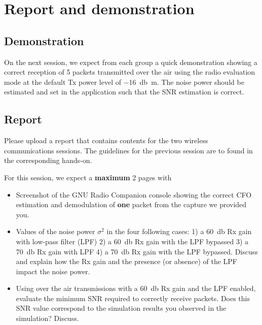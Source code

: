 \section{Report and demonstration}

\subsection{Demonstration}

On the next session, we expect from each group a quick demonstration showing a correct reception of 5 packets transmitted over the air using the radio evaluation mode
at the default Tx power level of \SI{-16}{\decibel\meter}. The noise power should be estimated and set in the application such that the SNR estimation is correct.

\subsection{Report}

Please upload a report that contains contents for the two wireless communications sessions.
The guidelines for the previous session are to found in the corresponding hands-on.

For this session, we expect a \textbf{maximum} 2 pages with
\begin{itemize}
    \item Screenshot of the GNU Radio Companion console showing the correct CFO estimation and demodulation of \textbf{one} packet from the capture we provided you.
    \item Values of the noise power $\sigma^2$ in the four following cases:
        1) a \SI{60}{\decibel} Rx gain with low-pass filter (LPF) 2) a \SI{60}{\decibel} Rx gain with the LPF bypassed 3) a \SI{70}{\decibel} Rx gain with LPF 4) a \SI{70}{\decibel} Rx gain with the LPF bypassed.
    Discuss and explain how the Rx gain and the presence (or absence) of the LPF impact the noise power.
\item Using over the air transmissions with a \SI{60}{\decibel} Rx gain and the LPF enabled, evaluate the minimum SNR required to correctly receive packets.
    Does this SNR value correspond to the simulation results you observed in the simulation? Discuss.
\end{itemize}
